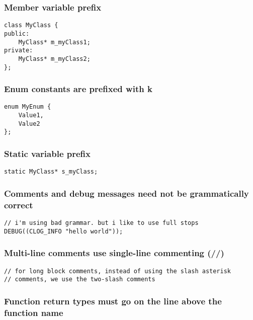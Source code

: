 \subsubsection{Member variable prefix}

\begin{verbatim}
class MyClass {
public:
    MyClass* m_myClass1;
private:
    MyClass* m_myClass2;
};
\end{verbatim}

\subsubsection{Enum constants are prefixed with k}

\begin{verbatim}
enum MyEnum {
    Value1,
    Value2
};
\end{verbatim}

\subsubsection{Static variable prefix}

\begin{verbatim}
static MyClass* s_myClass;
\end{verbatim}

\subsubsection{Comments and debug messages need not be grammatically correct}

\begin{verbatim}
// i'm using bad grammar. but i like to use full stops
DEBUG((CLOG_INFO "hello world"));
\end{verbatim}

\subsubsection{Multi-line comments use single-line commenting (//)}

\begin{verbatim}
// for long block comments, instead of using the slash asterisk
// comments, we use the two-slash comments
\end{verbatim}

\subsubsection{Function return types must go on the line above the function name}


